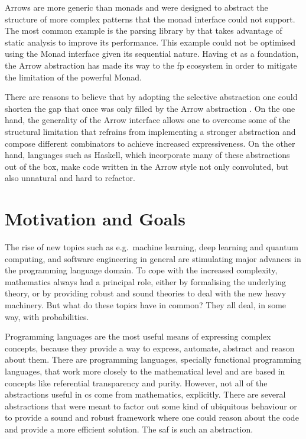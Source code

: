 \documentclass[
  oneside,
  11pt, a4paper,
  footinclude=true,
  headinclude=true,
  cleardoublepage=empty
]{scrbook}
\theoremstyle{definition}
\theoremstyle{definition}
\begin{document}
    Arrows \citep{Hughes:2000:GMA:347238.347246} are more generic than monads and were designed to abstract the structure of more complex patterns that the monad interface could not support. The most common example is the parsing library by \cite{swiestra&duponcheel} that takes advantage of static analysis to improve its performance. This example could not be optimised using the Monad interface given its sequential nature. Having \gls{ct} as a foundation, the Arrow abstraction has made its way to the \gls{fp} ecosystem in order to mitigate the limitation of the powerful Monad.
    
    There are reasons to believe that by adopting the selective abstraction one could shorten the gap that once was only filled by the Arrow abstraction \citep{Hughes:2000:GMA:347238.347246}. On the one hand, the generality of the Arrow interface allows one to overcome some of the structural limitation that refrains from implementing a stronger abstraction and compose different combinators to achieve increased expressiveness. On the other hand, languages such as Haskell, which incorporate many of these abstractions out of the box, make code written in the Arrow style not only convoluted, but also unnatural and hard to refactor.
    
    \section{Motivation and Goals}\label{sec-moti-goals}
    
    The rise of new topics such as e.g.\ machine learning, deep learning and quantum computing, and software engineering in general are stimulating major advances in the programming language domain. To cope with the increased complexity, mathematics always had a principal role, either by formalising the underlying theory, or by providing robust and sound theories to deal with the new heavy machinery. But what do these topics have in common? They all deal, in some way, with probabilities. 
	    
	Programming languages are the most useful means of expressing complex concepts, because they provide a way to express, automate, abstract and reason about them. There are programming languages, specially functional programming languages, that work more closely to the mathematical level and are based in concepts like referential transparency and purity. 
	However, not all of the abstractions useful in \gls{cs} come from mathematics, explicitly. There are several abstractions that were meant to factor out some kind of ubiquitous behaviour or to provide a sound and robust framework where one could reason about the code and provide a more efficient solution. The \gls{saf} is such an abstraction.
	    
\end{document}
